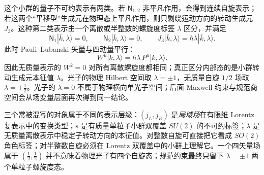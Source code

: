 这个小群的量子不可约表示有两类。若 $\mathsf N_{1,2}$ 非平凡作用，会得到连续自旋表示；若这两个“平移型”生成元在物理态上平凡作用，则只剩绕运动方向的转动生成元 $J_3$。这种第二类表示由一个离散或半整数的螺旋度标签 $\lambda$ 区分，并满足
\begin{equation}
 \mathsf N_1|\bar k,\lambda\rangle=0,
 \qquad
 \mathsf N_2|\bar k,\lambda\rangle=0,
 \qquad
 J_3|\bar k,\lambda\rangle=\hbar\lambda|\bar k,\lambda\rangle.
 \label{eq:massless-helicity-irrep-dp9}
\end{equation}
此时 Pauli--Lubanski 矢量与四动量平行：
\begin{equation}
 {W^\mu|k,\lambda\rangle
 =\hbar\lambda\,P^\mu|k,\lambda\rangle.}
 \label{eq:massless-pauli-lubanski-helicity-dp9}
\end{equation}
因此无质量表示的 $W^2=0$ 对所有离散螺旋度都相同；真正区分内部态的是小群转动生成元本征值 $\lambda$。光子的物理 Hilbert 空间取 $\lambda=\pm1$，无质量自旋 $1/2$ 场取 $\lambda=\pm\tfrac12$。光子的 $\lambda=0$ 不属于物理横向单光子空间；后面 Maxwell 约束与规范商空间会从场变量层面再次得到同一结论。

三个常被混写的对象属于不同的表示层级：$(j_L,j_R)$ 是\emph{局域场}在有限维 Lorentz 复表示中的变换类型；$s$ 是有质量单粒子小群双覆盖 $SU(2)$ 的不可约标签；$\lambda$ 是无质量离散表示中稳定子转动方向的本征值。对整数自旋可直接把它看成 $SO(2)$ 角色标签；对半整数自旋必须在 Lorentz 双覆盖中的小群上理解它。一个四矢量场属于 $(\tfrac12,\tfrac12)$ 并不意味着物理光子有四个自旋态；规范约束最终只留下 $\lambda=\pm1$ 两个单粒子螺旋度态。

